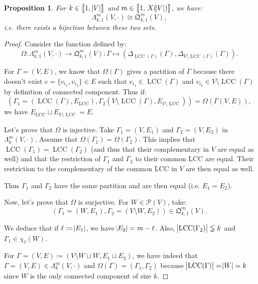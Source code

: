 \documentclass{article}
\newtheorem{proposition}[lemma]{Proposition}
\theoremstyle{definition}
\theoremstyle{remark}
\DeclareMathOperator{\LCC}{LCC}
\newcommand{\intint}[2]{\left\llbracket#1, \, #2\right\rrbracket}
\begin{document}
			\begin{proposition}\label{prp:Lambda_k,alpha^m(V, cdot) cong mathfrak Q_k,alpha^m(V)} For $k \in \intint 1{\abs V}$ and $m \in \intint 1{X(\abs V)}$, we have:
			\[\Lambda_{k,1}^m(V, \cdot) \cong \mathfrak Q_{k,1}^m(V),\]
			i.e. there exists a bijection between these two sets.
			\end{proposition}

			\begin{proof} Consider the function defined by:
			\[\Omega : \Lambda_{k,1}^m(V, \cdot) \to \mathfrak Q_{k,1}^m(V) :
				\Gamma \mapsto \left(\Delta_{\LCC(\Gamma)}(\Gamma), \Delta_{V \setminus \LCC(\Gamma)}(\Gamma)\right).\]

			For $\Gamma = (V, E)$, we know that $\Omega(\Gamma)$ gives a partition of $\Gamma$ because there doesn't exist $e = \{v_{i_1}, v_{i_2}\} \in E$ such that
			$v_{i_1} \in \LCC(\Gamma)$ and $v_{i_2} \in V \setminus \LCC(\Gamma)$ by definition of connected component. Thus if:
			\[\left(\Gamma_1 = (\LCC(\Gamma), E_{\LCC}), \Gamma_2(V \setminus \LCC(\Gamma), E_{V \setminus \LCC})\right) = \Omega(\Gamma(V, E)),\]
			we have $E_{\LCC} \sqcup E_{V \setminus \LCC} = E$.

			Let's prove that $\Omega$ is injective. Take $\Gamma_1 = (V, E_1)$ and $\Gamma_2 = (V, E_2)$ in $\Lambda_k^m(V, \cdot)$. Assume that
			$\Omega(\Gamma_1) = \Omega(\Gamma_2)$. This implies that $\LCC(\Gamma_1) = \LCC(\Gamma_2)$ (and thus that their complementary in $V$ are equal as well)
			and that the restriction of $\Gamma_1$ and $\Gamma_2$ to their common LCC are equal. Their restriction to the complementary of the common LCC in $V$ are then equal as well.

			Thus $\Gamma_1$ and $\Gamma_2$ have the same partition and are then equal (i.e. $E_1=E_2$).

			Now, let's prove that $\Omega$ is surjective. For $W \in \mathcal P(V)$, take:
			\[\left(\Gamma_1 = (W, E_1), \Gamma_2 = (V \setminus W, E_2)\right) \in \mathfrak Q_{k,1}^m(V).\]

			We deduce that if $\ell \coloneqq \abs {E_1}$, we have $\abs {E_2} = m-\ell$. Also, $\abs {\LCC(\Gamma_2)} \lneqq k$ and $\Gamma_1 \in \chi_\ell(W)$.

			For $\Gamma = (V, E) \coloneqq (V \setminus W \sqcup W, E_1 \sqcup E_2)$, we have indeed that $\Gamma = (V, E) \in \Lambda_k^m(V, \cdot)$ and
			$\Omega(\Gamma) = \left(\Gamma_1, \Gamma_2\right)$ because $\abs {\LCC(\Gamma)} = \abs W = k$ since $W$ is the only connected component of size $k$.
			\end{proof}
\end{document}
